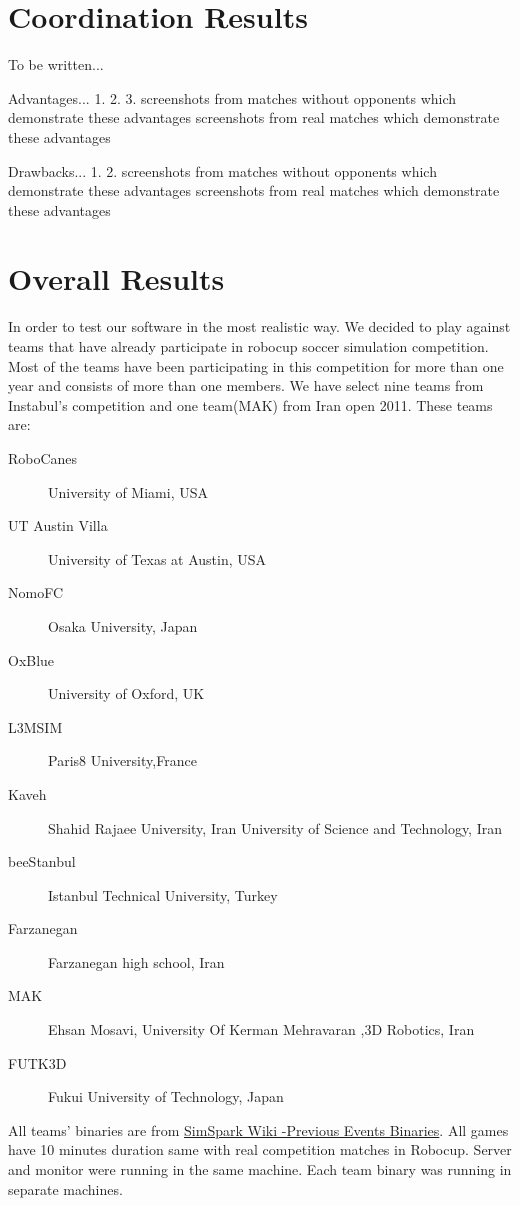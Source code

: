 \section{Coordination Results}
To be written...

Advantages...
1.
2.
3.
screenshots from matches without opponents which demonstrate these advantages
screenshots from real matches which demonstrate these advantages

Drawbacks...
1.
2.
screenshots from matches without opponents which demonstrate these advantages
screenshots from real matches which demonstrate these advantages

\section{Overall Results}
In order to test our software in the most realistic way. We decided to play against teams that have already participate in robocup soccer simulation competition. Most of the teams have been participating in this competition for more than one year and consists of more than one members. We have select nine teams from Instabul's competition and one team(MAK) from Iran open 2011. These teams are:
\begin{description}
\item[RoboCanes]	University of Miami, USA 
\item[UT Austin Villa]	University of Texas at Austin, USA
\item[NomoFC]	Osaka University, Japan
\item[OxBlue]	University of Oxford, UK
\item[L3MSIM]	Paris8 University,France
\item[Kaveh] 	Shahid Rajaee University, Iran University of Science and Technology, Iran
\item[beeStanbul]	Istanbul Technical University, Turkey
\item[Farzanegan]	Farzanegan high school, Iran
\item[MAK]	Ehsan Mosavi, University Of Kerman Mehravaran ,3D Robotics, Iran
\item[FUTK3D]	Fukui University of Technology, Japan
\end{description}
All teams' binaries are from \href{http://simspark.sourceforge.net/binaries/RoboCup2011/}{SimSpark Wiki -Previous Events Binaries}.
All games have 10 minutes duration same with real competition matches in Robocup. Server and monitor were running in the same machine\footnotemark. Each team binary was running in separate machines\footnotemark.
